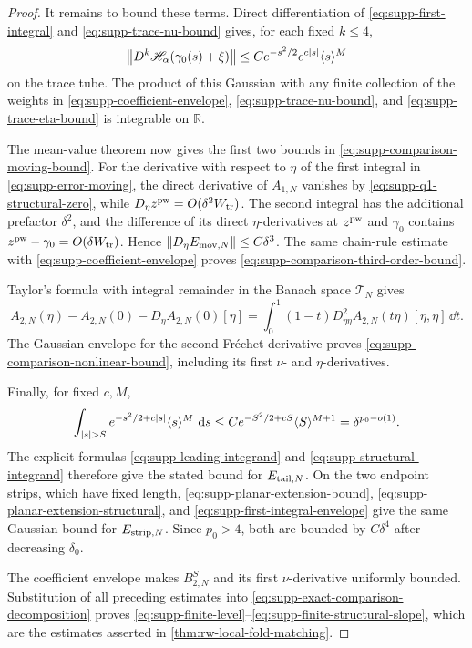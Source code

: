 \begin{proof}
It remains to bound these terms.  Direct differentiation of
\eqref{eq:supp-first-integral} and
\eqref{eq:supp-trace-nu-bound} gives, for each fixed \(k\le4\),
\begin{equation}
 \left\lVert D^k\mathscr H_\alpha(\gamma_0(s)+\xi)\right\rVert
 \le Ce^{-s^2/2}e^{c\left\lvert s\right\rvert}\langle s\rangle^M
 \label{eq:supp-first-integral-envelope}
\end{equation}
on the trace tube.  The product of this Gaussian with any finite collection
of the weights in \eqref{eq:supp-coefficient-envelope},
\eqref{eq:supp-trace-nu-bound}, and
\eqref{eq:supp-trace-eta-bound} is integrable on \(\mathbb R\).

The mean-value theorem now gives the first two bounds in
\eqref{eq:supp-comparison-moving-bound}.  For the derivative with respect to
\(\eta\) of
the first integral in \eqref{eq:supp-error-moving}, the direct derivative of
\(A_{1,N}\) vanishes by \eqref{eq:supp-q1-structural-zero}, while
\(D_\eta z^{\rm pw}=O(\delta^2W_{\rm tr})\).  The second integral has the
additional prefactor \(\delta^2\), and the difference of its direct
\(\eta\)-derivatives at \(z^{\rm pw}\) and \(\gamma_0\) contains
\(z^{\rm pw}-\gamma_0=O(\delta W_{\rm tr})\).  Hence
\(\left\lVert D_\eta E_{{\rm mov},N}\right\rVert\le C\delta^3\).
The same chain-rule estimate with
\eqref{eq:supp-coefficient-envelope} proves
\eqref{eq:supp-comparison-third-order-bound}.

Taylor's formula with integral remainder in the Banach space
\(\mathcal T_N\) gives
\begin{equation}
 A_{2,N}(\eta)-A_{2,N}(0)-D_\eta A_{2,N}(0)[\eta]
 =\int_0^1(1-t)D_{\eta\eta}^2A_{2,N}(t\eta)[\eta,\eta]\,\dd t.
 \label{eq:supp-structural-taylor-formula}
\end{equation}
The Gaussian envelope for the second Fr\'echet derivative proves
\eqref{eq:supp-comparison-nonlinear-bound}, including its first
\(\nu\)- and \(\eta\)-derivatives.

Finally, for fixed \(c,M\),
\begin{equation}
 \int_{\left\lvert s\right\rvert>S}e^{-s^2/2+c\left\lvert s\right\rvert}\langle s\rangle^M\,\,\mathrm d s
 \le Ce^{-S^2/2+cS}\langle S\rangle^{M+1}
 =\delta^{p_0-o(1)}.
 \label{eq:supp-gaussian-tail}
\end{equation}
The explicit formulas \eqref{eq:supp-leading-integrand} and
\eqref{eq:supp-structural-integrand} therefore give the stated bound for
\(E_{{\rm tail},N}\).  On the two endpoint strips, which have fixed length,
\eqref{eq:supp-planar-extension-bound},
\eqref{eq:supp-planar-extension-structural}, and
\eqref{eq:supp-first-integral-envelope} give the same Gaussian bound for
\(E_{{\rm strip},N}\).  Since \(p_0>4\), both are bounded by
\(C\delta^4\) after decreasing \(\delta_0\).

The coefficient envelope makes \(B_{2,N}^S\) and its first
\(\nu\)-derivative uniformly bounded.  Substitution of all preceding
estimates into \eqref{eq:supp-exact-comparison-decomposition} proves
\eqref{eq:supp-finite-level}--\eqref{eq:supp-finite-structural-slope},
which are the estimates asserted in \cref{thm:rw-local-fold-matching}.
\end{proof}
